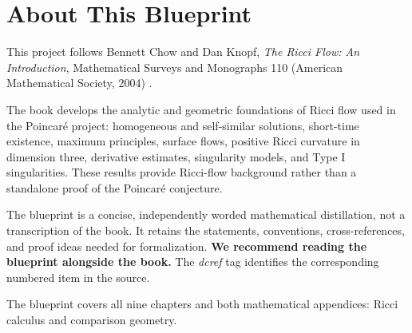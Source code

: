

\chapter*{About This Blueprint}

This project follows Bennett Chow and Dan Knopf, \emph{The Ricci Flow: An
Introduction}, Mathematical Surveys and Monographs 110 (American Mathematical
Society, 2004) \cite{chowKnopf2004ricci}.

The book develops the analytic and geometric foundations of Ricci flow used in
the Poincar\'e project: homogeneous and self-similar solutions, short-time
existence, maximum principles, surface flows, positive Ricci curvature in
dimension three, derivative estimates, singularity models, and Type I
singularities. These results provide Ricci-flow background rather than a
standalone proof of the Poincar\'e conjecture.

The blueprint is a concise, independently worded mathematical distillation,
not a transcription of the book. It retains the statements, conventions,
cross-references, and proof ideas needed for formalization. \textbf{We
recommend reading the blueprint alongside the book.} The \emph{dcref} tag
identifies the corresponding numbered item in the source.

The blueprint covers all nine chapters and both mathematical appendices:
Ricci calculus and comparison geometry.










\appendix


